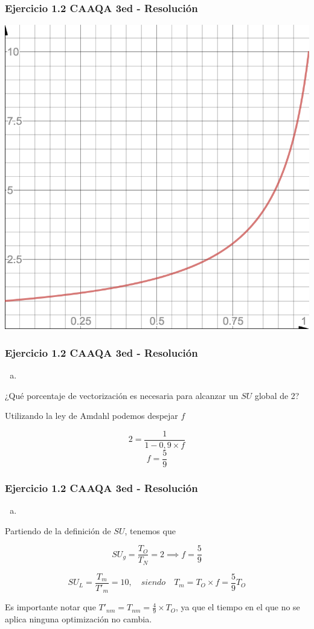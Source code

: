 \documentclass{beamer}
\begin{document}
\begin{frame}
\frametitle{Ejercicio 1.2 CAAQA 3ed - Resolución}

 \includegraphics[scale=0.25]{amdahl_resuelto_1.png}

\end{frame}

\begin{frame}
\frametitle{Ejercicio 1.2 CAAQA 3ed - Resolución}
\begin{enumerate}[b.]
\item
\end{enumerate}
¿Qué porcentaje de vectorización es necesaria para alcanzar un $SU$ global de 2?

 Utilizando la ley de Amdahl podemos despejar $f$

 $$ 2 = \frac{1}{1 - 0,9 \times f}$$
 $$ f  = \frac{5}{9} $$

\end{frame}


\begin{frame}
\frametitle{Ejercicio 1.2 CAAQA 3ed - Resolución}
\begin{enumerate}[c.]
\item
\end{enumerate}

Partiendo de la definición de $SU$, tenemos que 

 $$ SU_g = \frac{T_O}{T_N} = 2 \implies f = \frac{5}{9} $$

 $$ SU_L = \frac{T_m}{T'_m} = 10,\quad siendo \quad T_m = T_O \times f = \frac{5}{9}T_O $$

Es importante notar que $ T'_{nm} = T_{nm} = \frac{4}{9} \times T_O $, ya que el tiempo 
 en el que no se aplica ninguna optimización no cambia.
 
 \end{frame}
\end{document}
